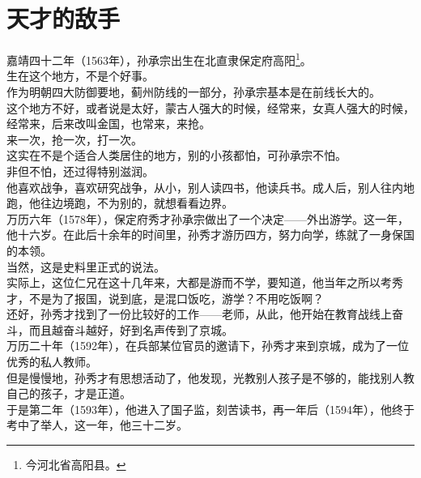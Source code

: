 \section{天才的敌手}
\ifnum{}
	\begin{multicols}{\theparacolNo}
\fi
嘉靖四十二年（1563年），孙承宗出生在北直隶保定府高阳\footnote{今河北省高阳县。}。\\

生在这个地方，不是个好事。\\

作为明朝四大防御要地，蓟州防线的一部分，孙承宗基本是在前线长大的。\\

这个地方不好，或者说是太好，蒙古人强大的时候，经常来，女真人强大的时候，经常来，后来改叫金国，也常来，来抢。\\

来一次，抢一次，打一次。\\

这实在不是个适合人类居住的地方，别的小孩都怕，可孙承宗不怕。\\

非但不怕，还过得特别滋润。\\

他喜欢战争，喜欢研究战争，从小，别人读四书，他读兵书。成人后，别人往内地跑，他往边境跑，不为别的，就想看看边界。\\

万历六年（1578年），保定府秀才孙承宗做出了一个决定——外出游学。这一年，他十六岁。在此后十余年的时间里，孙秀才游历四方，努力向学，练就了一身保国的本领。\\

当然，这是史料里正式的说法。\\

实际上，这位仁兄在这十几年来，大都是游而不学，要知道，他当年之所以考秀才，不是为了报国，说到底，是混口饭吃，游学？不用吃饭啊？\\

还好，孙秀才找到了一份比较好的工作——老师，从此，他开始在教育战线上奋斗，而且越奋斗越好，好到名声传到了京城。\\

万历二十年（1592年），在兵部某位官员的邀请下，孙秀才来到京城，成为了一位优秀的私人教师。\\

但是慢慢地，孙秀才有思想活动了，他发现，光教别人孩子是不够的，能找别人教自己的孩子，才是正道。\\

于是第二年（1593年），他进入了国子监，刻苦读书，再一年后（1594年），他终于考中了举人，这一年，他三十二岁。\\


\end{multicols}
